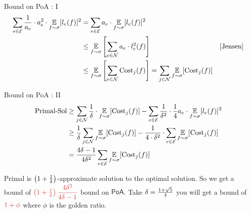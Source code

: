 \documentclass[aspectratio=1610,handout]{beamer}
\begin{document}
\begin{frame}{Bound on \textsf{PoA} : I}
	\vspace*{-8mm}
	\begin{align*}
		\sum_{e\in \mathcal{E}} \frac1{ a_e}\cdot a_e^2\cdot \underset{f\sim \sigma}{\mathbb{E}}[l_e(f)]^2 & = \sum_{e\in \mathcal{E}}  a_e\cdot\underset{f\sim \sigma}{\mathbb{E}}[l_e(f)]^2                                                                                        \\
		                                                                                   & \leq \underset{f\sim \sigma}{\mathbb{E}}\left[ \sum_{e\in\mathcal{N}} a_e\cdot l_e^2(f)  \right]                                                           & [\text{Jensen}] \\
		                                                                                   & \leq \underset{f\sim \sigma}{\mathbb{E}}\left[ \sum_{e\in\mathcal{N}} \text{Cost}_j(f)\right] =\sum_{j\in\mathcal{N}}\underset{f\sim \sigma}{\mathbb{E}}[\text{Cost}_j(f)]
	\end{align*}
\end{frame}
\begin{frame}{Bound on \textsf{PoA} : II}
	\begin{align*}
		\text{Primal-Sol} & \geq \sum\limits_{j\in \mathcal{N}}\frac1{\delta}\cdot \underset{f\sim \sigma}{\mathbb{E}}[\text{Cost}_j(f)]-\sum_{e\in \mathcal{E}}\frac1{\delta^2}\cdot \frac1{4}a_e\cdot \underset{f\sim \sigma}{\mathbb{E}}[l_e(f)]^2 \\
		                  & \geq  \frac{1}{\delta}\sum_{j\in\mathcal{N}}\underset{f\sim \sigma}{\mathbb{E}}[\text{Cost}_j(f)]-\frac1{4\cdot \delta^2}\cdot \sum_{e\in \mathcal{E}}\underset{f\sim \sigma}{\mathbb{E}}[\text{Cost}_j(f)]               \\
		                  & = \frac{4\delta-1}{4\delta^2}\sum_{e\in \mathcal{E}}\underset{f\sim \sigma}{\mathbb{E}}[\text{Cost}_j(f)]
	\end{align*}\pause

	Primal is $\left(1+\frac1{\delta}\right)$-approximate solution to the optimal solution. So we get a bound of $\mathcolor{myr}{\lt(1+\frac1{\dl}\rt)\dfrac{4\dl^2}{4\dl-1}}$ bound on $\textsf{PoA}$.  Take $\delta=\frac{1+\sqrt{5}}{4}$ you will get a bound of $\mathcolor{myr}{1+\phi}$ where $\phi$ is the golden ratio.
\end{frame}
\end{document}
